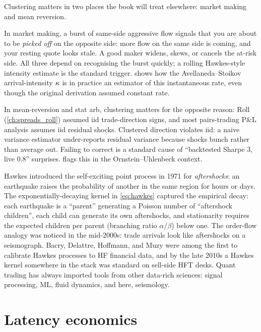 Clustering matters in two places the book will treat
elsewhere: market making and mean reversion.

In market making, a burst of same-side aggressive flow signals
that you are about to be \emph{picked off} on the opposite side:
more flow on the same side is coming, and your resting quote
looks stale. A good maker widens, skews, or cancels the at-risk
side. All three depend on recognising the burst quickly; a
rolling Hawkes-style intensity estimate is the standard trigger.
 shows how the Avellaneda--Stoikov
arrival-intensity $\kappa$ is in practice an estimator of this
instantaneous rate, even though the original \citeAS{}
derivation assumed constant rate.

In mean-reversion and stat arb, clustering matters for the
opposite reason: Roll (\cref{ch:spreads_roll}) assumed iid
trade-direction signs, and most pairs-trading P\&L analysis
assumes iid residual shocks. Clustered direction violates iid:
a naive variance estimator under-reports residual variance
because shocks bunch rather than average out. Failing to
correct is a standard cause of ``backtested Sharpe $3$, live
$0.8$'' surprises.  flags this in the
Ornstein--Uhlenbeck context.

\begin{historybox}[title={Hawkes, seismology, and the migration to finance}]
Hawkes introduced the self-exciting point process in 1971
\citep{hawkes1971spectra} for \emph{aftershocks}: an earthquake
raises the probability of another in the same region for hours
or days. The exponentially-decaying kernel in \cref{eq:hawkes}
captured the empirical decay: each earthquake is a ``parent''
generating a Poisson number of ``aftershock children'', each
child can generate its own aftershocks, and stationarity requires
the expected children per parent (branching ratio
$\alpha/\beta$) below one. The order-flow analogy was noticed in
the mid-2000s: trade arrivals look like aftershocks on a
seismograph. Bacry, Delattre, Hoffmann, and Muzy were among the
first to calibrate Hawkes processes to HF financial data, and by
the late 2010s a Hawkes kernel somewhere in the stack was
standard on sell-side HFT desks. Quant trading has always
imported tools from other data-rich sciences: signal
processing, ML, fluid dynamics, and here, seismology.
\end{historybox}

\section{Latency economics}
\label{sec:latency}

